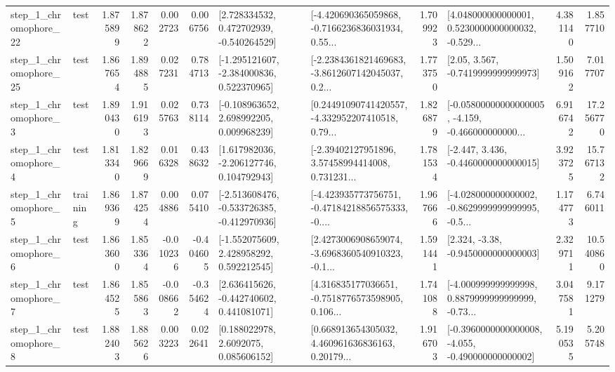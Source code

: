 \begin{tabular}{llrrrrllrlrr}
    step\_1\_chromophore\_22 &      test &      1.875899 &    1.878622 &      0.002723 &  0.006756 &    [2.728334532, 0.472702939, -0.540264529] &  [-4.420690365059868, -0.7166236836031934, 0.55... &       1.709923 &  [4.048000000000001, 0.5230000000000032, -0.529... &            4.381140 &          1.857710 \\
    step\_1\_chromophore\_25 &      test &      1.867654 &    1.894885 &      0.027231 &  0.784713 &   [-1.295121607, -2.384000836, 0.522370965] &  [-2.2384361821469683, -3.8612607142045037, 0.2... &       1.773750 &                 [2.05, 3.567, -0.7419999999999973] &            1.509162 &          7.017707 \\
     step\_1\_chromophore\_3 &      test &      1.890430 &    1.916193 &      0.025763 &  0.738114 &    [-0.108963652, 2.698992205, 0.009968239] &  [0.24491090741420557, -4.332952207410518, 0.79... &       1.826879 &  [-0.05800000000000005, -4.159, -0.466000000000... &            6.916742 &         17.256770 \\
     step\_1\_chromophore\_4 &      test &      1.813340 &    1.829669 &      0.016328 &  0.438632 &    [1.617982036, -2.206127746, 0.104792943] &  [-2.39402127951896, 3.57458994414008, 0.731231... &       1.781534 &               [-2.447, 3.436, -0.4460000000000015] &            3.923725 &         15.767132 \\
     step\_1\_chromophore\_5 &  training &      1.869369 &    1.874254 &      0.004886 &  0.075410 &  [-2.513608476, -0.533726385, -0.412970936] &  [-4.423935773756751, -0.47184218856575333, -0.... &       1.967666 &  [-4.028000000000002, -0.8629999999999995, -0.5... &            1.174773 &          6.746011 \\
     step\_1\_chromophore\_6 &      test &      1.863600 &    1.853364 &     -0.010236 & -0.404605 &    [-1.552075609, 2.428958292, 0.592212545] &  [2.4273006908659074, -3.6968360540910323, -0.1... &       1.591441 &                [2.324, -3.38, -0.9450000000000003] &            2.329711 &         10.540860 \\
     step\_1\_chromophore\_7 &      test &      1.864525 &    1.855863 &     -0.008662 & -0.354624 &    [2.636415626, -0.442740602, 0.441081071] &  [4.316835177036651, -0.7518776573598905, 0.106... &       1.741088 &  [-4.000999999999998, 0.8879999999999999, -0.73... &            3.047581 &          9.171279 \\
     step\_1\_chromophore\_8 &      test &      1.882403 &    1.885626 &      0.003223 &  0.022641 &       [0.188022978, 2.6092075, 0.085606152] &  [0.668913654305032, 4.460961636836163, 0.20179... &       1.916703 &  [-0.3960000000000008, -4.055, -0.490000000000002] &            5.190535 &          5.205748 \\

\end{tabular}
